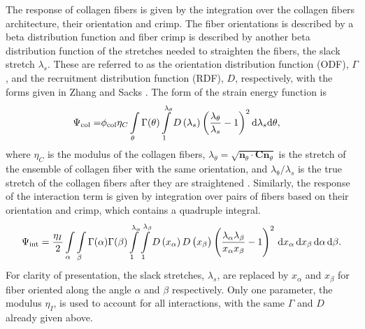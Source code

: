 	The response of collagen fibers is given by the integration over the collagen fibers architecture, their orientation and crimp. The fiber orientations is described by a beta distribution function and fiber crimp is described by another beta distribution function of the stretches needed to straighten the fibers, the slack stretch $\lambda_s$. These are referred to as the orientation distribution function (ODF), $\Gamma$, and the recruitment distribution function (RDF), $D$, respectively, with the forms given in Zhang and Sacks \cite{zhang_meso_2016, zhang_modeling_2017, sacks_novel_2016}. The form of the strain energy function is 
\begin{equation} \label{eqn:collagen}
\begin{aligned}
\Psi_\mathrm{col} =& \phi_\mathrm{col} \eta_C \int\displaylimits_\theta \Gamma(\theta) 
\int\displaylimits_1^{\lambda_\theta} D\left(\lambda_s \right) \left( \frac{\lambda_\theta}{\lambda_s} - 1\right)^2 \mathrm{d}\lambda_s \mathrm{d}\theta,
\end{aligned}
\end{equation}
    where $\eta_C$ is the modulus of the collagen fibers, $\lambda_\theta = \sqrt{\mathbf{n}_\theta \cdot \mathbf{C}\mathbf{n}_\theta}$ is the stretch of the ensemble of collagen fiber with the same orientation, and $\lambda_\mathrm{\theta}/\lambda_s$ is the true stretch of the collagen fibers after they are straightened \cite{zhang_meso_2016}. Similarly, the response of the interaction term is given by integration over pairs of fibers based on their orientation and crimp, which contains a quadruple integral. 
\begin{equation}
\Psi_\mathrm{int} = \frac{\eta_I}{2} \int\displaylimits_\alpha \int\displaylimits_\beta \Gamma(\alpha) \Gamma(\beta) \int\displaylimits_1^{\lambda_\alpha} \int\displaylimits_1^{\lambda_\beta} D\left( x_\alpha \right) D\left( x_\beta \right) \left( \frac{\lambda_\alpha \lambda_\beta}{x_\alpha x_\beta} - 1\right)^2 \,\mathrm{d}x_\alpha \,\mathrm{d}x_\beta \,\mathrm{d}\alpha \,\mathrm{d}\beta.
\end{equation}
For clarity of presentation, the slack stretches, $\lambda_s$, are replaced by $x_\alpha$ and $x_\beta$ for fiber oriented along the angle $\alpha$ and $\beta$ respectively. Only one parameter, the modulus $\eta_I$, is used to account for all interactions, with the same $\Gamma$ and $D$ already given above. 

